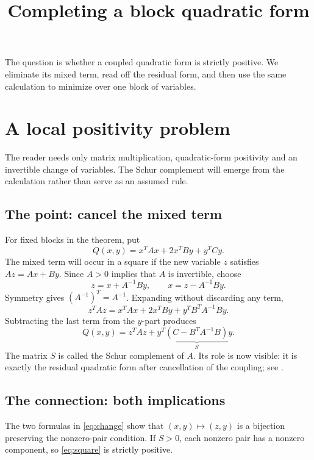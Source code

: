 \documentclass[12pt,reqno]{amsart}
\title{Completing a block quadratic form}
\date{}
\begin{document}
\maketitle

The question is whether a coupled quadratic form is strictly positive.
We eliminate its mixed term, read off the residual form, and then use the
same calculation to minimize over one block of variables.

\section{A local positivity problem}
The reader needs only matrix multiplication, quadratic-form positivity
and an invertible change of variables. The Schur complement will emerge
from the calculation rather than serve as an assumed rule.

\begin{theorem}\label{thm:schur}

\end{theorem}

\subsection*{The point: cancel the mixed term}
For fixed blocks in the theorem, put
\[
 Q(x,y)=x^TAx+2x^TBy+y^TCy.
\]
The mixed term will occur in a square if the new variable $z$ satisfies
$Az=Ax+By$. Since $A>0$ implies that $A$ is invertible, choose
\begin{equation}\label{eq:change}
 z=x+A^{-1}By,\qquad x=z-A^{-1}By.
\end{equation}
Symmetry gives $(A^{-1})^T=A^{-1}$. Expanding without discarding any term,
\[
 z^TAz=x^TAx+2x^TBy+y^TB^TA^{-1}By.
\]
Subtracting the last term from the $y$-part produces
\begin{equation}\label{eq:square}
 Q(x,y)=z^TAz+y^T\underbrace{(C-B^TA^{-1}B)}_{S}y.
\end{equation}
The matrix $S$ is called the Schur complement of $A$. Its role is now
visible: it is exactly the residual quadratic form after cancellation
of the coupling; see \cite[Appendix A.5.5]{S-Boyd}.

\subsection*{The connection: both implications}
The two formulas in \eqref{eq:change} show that $(x,y)\mapsto(z,y)$ is a
bijection preserving the nonzero-pair condition. If $S>0$, each nonzero
pair has a nonzero component, so \eqref{eq:square} is strictly positive.
\end{document}
